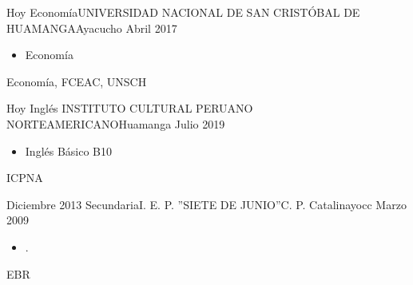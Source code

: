 \begin{experiences}

  \experience
  {Hoy}    {Economía}{UNIVERSIDAD NACIONAL DE SAN CRISTÓBAL DE HUAMANGA}{Ayacucho}
  {Abril 2017}   {
    \begin{itemize}
      \item Economía
    \end{itemize}
  }
  {Economía, FCEAC, UNSCH}
  \emptySeparator

  \experience
  {Hoy}    {Inglés}{ INSTITUTO CULTURAL PERUANO NORTEAMERICANO}{Huamanga}
  {Julio 2019}   {
    \begin{itemize}
      \item  Inglés Básico B10
    \end{itemize}
  }
  {ICPNA}
  \emptySeparator

  \experience
  {Diciembre 2013}    {Secundaria}{I. E. P. ”SIETE DE JUNIO”}{C. P. Catalinayocc}
  {Marzo 2009}   {
    \begin{itemize}
      \item .
    \end{itemize}
  }
  {EBR}


\end{experiences}




